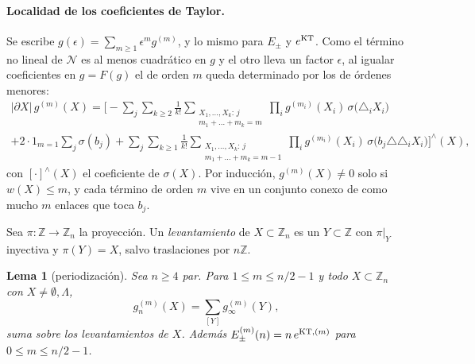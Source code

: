 \documentclass[11pt,a4paper]{article}
\newtheorem{lema}[teorema]{Lema}
\theoremstyle{remark}
\begin{document}
\paragraph{Localidad de los coeficientes de Taylor.} Se escribe
$g(\epsilon)=\sum_{m\ge1}\epsilon^mg^{(m)}$, y lo mismo para $E_\pm$ y $e^{\rm KT}$. Como el término no
lineal de $\mathcal N$ es al menos cuadrático en $g$ y el otro lleva un factor $\epsilon$, al igualar
coeficientes en $g=F(g)$ el de orden $m$ queda determinado por los de órdenes menores:
\begin{multline}\label{eq:recurrencia}
  |\partial X|\,g^{(m)}(X)=\Big[-\sum_j\sum_{k\ge2}\frac1{k!}\sum_{\substack{X_1,\dots,X_k:\,j\\ m_1+\dots+m_k=m}}
  \prod_ig^{(m_i)}(X_i)\,\sigma\big(\textstyle\triangle_iX_i\big)\\
  +2\cdot1_{m=1}\sum_j\sigma(b_j)
  +\sum_j\sum_{k\ge1}\frac1{k!}\sum_{\substack{X_1,\dots,X_k:\,j\\ m_1+\dots+m_k=m-1}}\prod_ig^{(m_i)}(X_i)\,
  \sigma\big(b_j\triangle\textstyle\triangle_iX_i\big)\Big]^\wedge(X),
\end{multline}
con $[\cdot]^\wedge(X)$ el coeficiente de $\sigma(X)$. Por inducción, $g^{(m)}(X)\ne0$ solo si $w(X)\le m$,
y cada término de orden $m$ vive en un conjunto conexo de como mucho $m$ enlaces que toca $b_j$.

Sea $\pi:\mathbb Z\to\mathbb Z_n$ la proyección. Un \emph{levantamiento} de $X\subset\mathbb Z_n$ es un
$Y\subset\mathbb Z$ con $\pi|_Y$ inyectiva y $\pi(Y)=X$, salvo traslaciones por $n\mathbb Z$.

\begin{lema}[periodización]\label{lem:periodizacion}
Sea $n\ge4$ par. Para $1\le m\le n/2-1$ y todo $X\subset\mathbb Z_n$ con $X\ne\emptyset,\Lambda$,
\[
  g_n^{(m)}(X)=\sum_{[Y]}g_\infty^{(m)}(Y),
\]
suma sobre los levantamientos de $X$. Además $E_\pm^{(m)}(n)=n\,e^{{\rm KT},(m)}$ para
$0\le m\le n/2-1$.
\end{lema}
\end{document}
